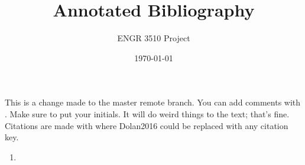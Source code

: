 \documentclass[12pt,letterpaper]{article}
\begin{document}
\title{Annotated Bibliography}
\author{ENGR 3510 Project}
\date{\today}
\maketitle

This is a change made to the master remote branch.
You can add comments with . Make sure to put your initials. It will do weird things to the text; that's fine. 
Citations are made with \cite{Dolan2016} where Dolan2016 could be replaced with any citation key. 


\begin{enumerate}
	\item \cite{Nan2013}
\end{enumerate}

\printbibliography
\end{document}
